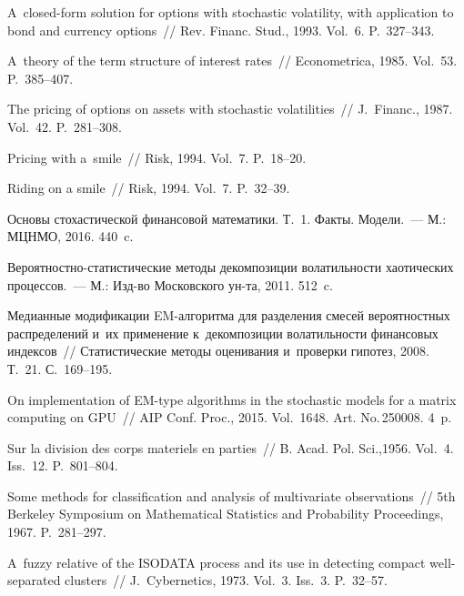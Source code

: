 \begin{multicols}{2}
{{\begin{thebibliography}{99}
 A~closed-form solution for options with stochastic
 volatility, with application to bond and currency options~// 
 Rev. Financ. Stud., 1993. Vol.~6. P.~327--343.

A~theory of the term structure of interest rates~// 
Econometrica, 1985. Vol.~53. P.~385--407.

 The pricing of options on assets 
with stochastic volatilities~// J.~Financ., 1987. Vol.~42. P.~281--308.

Pricing with a~smile~// Risk, 1994. Vol.~7. P.~18--20.

 Riding on a smile~// Risk, 1994. Vol.~7. P.~32--39.

 Основы стохастической финансовой математики.
 Т.~1. Факты. Модели.~--- М.: МЦНМО, 2016. 440~c.

 Ве\-ро\-ят\-ност\-но-ста\-ти\-сти\-че\-ские 
методы декомпозиции волатильности хаотических процессов.~--- 
М.: Изд-во Московского ун-та, 2011. 512~c.

Медианные модификации EM-алгоритма для разделения смесей вероятностных 
распределений и~их применение к~декомпозиции волатильности финансовых 
индексов~//
Статистические методы оценивания и~про\-вер\-ки гипотез, 2008. 
Т.~21. С.~169--195.

On implementation of EM-type algorithms in the stochastic models for a matrix 
computing on GPU~// AIP Conf. Proc., 2015. Vol.~1648. Art. No.\,250008. 4~p.

 Sur la division des corps materiels en parties~// 
B. Acad. Pol. Sci.,1956. Vol.~4. Iss.~12. P.~801--804.

 Some methods for 
classification and analysis of multivariate observations~// 
5th Berkeley Symposium on Mathematical Statistics and Probability
Proceedings, 1967. P.~281--297.

 A~fuzzy relative of the ISODATA process and its use in 
detecting compact well-separated clusters~// 
J.~Cybernetics, 1973. Vol.~3. Iss.~3. P.~32--57.


\end{thebibliography}}}
\end{multicols}
